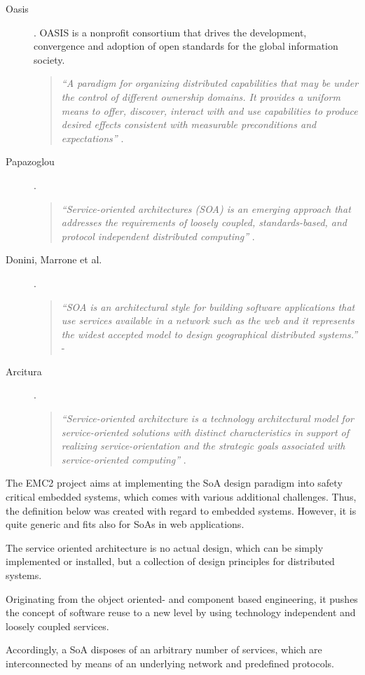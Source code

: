 \begin{description}
	\item [Oasis].
	OASIS is a nonprofit consortium that drives the development, convergence and adoption of open standards for the global information society.
	\begin{quote}
	\emph{``A paradigm for organizing distributed capabilities that may be under the control of different ownership domains. It provides a uniform means to offer, discover, interact with and use capabilities to produce desired effects consistent with measurable preconditions and expectations''} \cite{oasis2006}.
	\end{quote}

	\item [Papazoglou].
	\begin{quote}
	\emph{``Service-oriented architectures (SOA) is an emerging approach that addresses the requirements of loosely coupled, standards-based, and protocol independent distributed computing''} \cite{papazoglou2007}.
	\end{quote}

	\item [Donini, Marrone et al.].
	\begin{quote}
	\emph{``SOA is an architectural style for building software applications that use services available in a network such as the web and it represents the widest accepted model to design geographical distributed systems.''} - \cite{donini2008}
	\end{quote}

	\item [Arcitura].
	\begin{quote}
	\emph{``Service-oriented architecture is a technology architectural model for service-oriented solutions with distinct characteristics in support of realizing service-orientation and the strategic goals associated with service-oriented computing''} \cite{arcitura}.
	\end{quote}
\end{description}


The EMC2 project aims at implementing the SoA design paradigm into safety critical embedded systems, which comes with various additional challenges. Thus, the definition below was created with regard to embedded systems. However, it is quite generic and fits also for SoAs in web applications.

\begin{myquote}
	The service oriented architecture is no actual design, which can be simply implemented or installed, but a collection of design principles for distributed systems.

	Originating from the object oriented- and component based engineering, it pushes the concept of software reuse to a new level by using technology independent and loosely coupled services.

	Accordingly, a SoA disposes of an arbitrary number of services, which are interconnected by means of an underlying network and predefined protocols.
\end{myquote}

